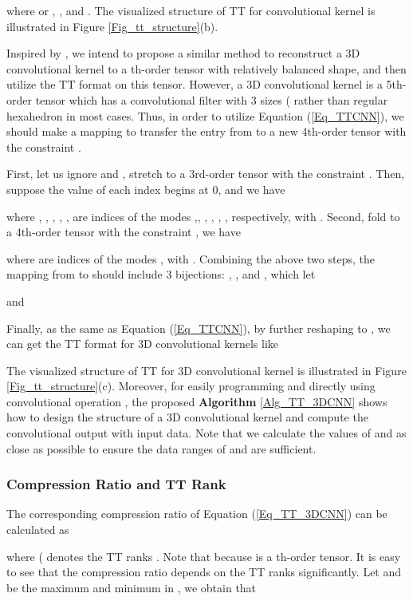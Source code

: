 \documentclass[a4paper,fleqn]{cas-dc}
\begin{document}
where  or , , and  . The visualized structure of TT for convolutional kernel  is illustrated in Figure \ref{Fig_tt_structure}(b).

Inspired by \citet{Garipov_2016_TTCNN}, we intend to propose a similar method to reconstruct a 3D convolutional kernel to a th-order tensor with relatively balanced shape, and then utilize the TT format on this tensor. However, a 3D convolutional kernel  is a 5th-order tensor which has a convolutional filter with 3 sizes ( rather than regular hexahedron in most cases. Thus, in order to utilize Equation (\ref{Eq_TTCNN}), we should make a mapping to transfer the entry from  to a new 4th-order tensor  with the constraint .

First, let us ignore  and , stretch  to a 3rd-order tensor  with the constraint . Then, suppose the value of each index begins at 0, and we have

where , , , , ,  are indices of the modes ,, , , , , respectively, with . Second, fold  to a 4th-order tensor  with the constraint , we have

where  are indices of the modes , with . Combining the above two steps, the mapping from  to  should include 3 bijections: , , and , which let

and


Finally, as the same as Equation (\ref{Eq_TTCNN}), by further reshaping  to , we can get the TT format for 3D convolutional kernels like


The visualized structure of TT for 3D convolutional kernel     is illustrated in Figure \ref{Fig_tt_structure}(c). Moreover, for easily programming and directly using convolutional operation , the proposed \textbf{Algorithm} \ref{Alg_TT_3DCNN} shows how to design the structure of a 3D convolutional kernel and compute the convolutional output with input data. Note that we calculate the values of  and  as close as possible to ensure the data ranges of  and  are sufficient.

\subsubsection{Compression Ratio and TT Rank}\quad

The corresponding compression ratio of Equation (\ref{Eq_TT_3DCNN}) can be calculated as

where  ( denotes the TT ranks . Note that  because  is a th-order tensor. It is easy to see that the compression ratio depends on the TT ranks significantly. Let  and  be the maximum and minimum  in , we obtain that 
\end{document}
